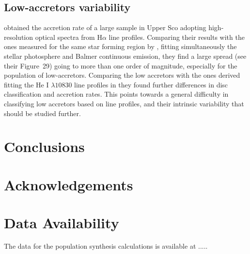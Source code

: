 \documentclass[fleqn,usenatbib,letters]{mnras}
\begin{document}

\subsection{Low-accretors variability}

\citet{Fang2023} obtained the accretion rate of a large sample in Upper Sco adopting high-resolution optical spectra from H$\alpha$ line profiles. Comparing their results with the ones measured for the same star forming region by \citet{Manara2020}, fitting simultaneously the stellar photosphere and Balmer continuous emission, they find a large spread (see their Figure~29) going to more than one order of magnitude, especially for the population of low-accretors. Comparing the low accretors with the ones derived fitting the He I $\lambda10830$ line profiles in \citet{Thanathibodee2023} they found further differences in disc classification and accretion rates. This points towards a general difficulty in classifying low accretors based on line profiles, and their intrinsic variability that should be studied further.

\section{Conclusions}\label{sec:conclusions}

\section*{Acknowledgements}

\section*{Data Availability}

The data for the population synthesis calculations is available at ..... 







\appendix


\bsp	%
\label{lastpage}
\end{document}
